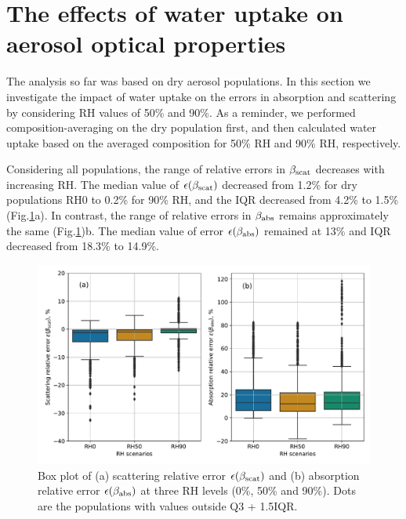 \documentclass[edeposit,fullpage]{uiucthesis2009}
\begin{document}
\section{The effects of water uptake on aerosol optical properties}
\label{sec:wet-case}
The analysis so far was based on dry aerosol populations. In this
section we investigate the impact of water uptake on the errors in
absorption and scattering by considering RH values of 50\% and 90\%.
As a reminder, we performed composition-averaging on the dry
population first, and then calculated water uptake based on the
averaged composition for 50\% RH and 90\% RH, respectively.

Considering all populations, the range of relative errors in
$\beta_{\rm scat}$ decreases with increasing RH. The median value of
$\epsilon(\beta_{\rm scat})$ decreased from 1.2\% for dry populations
RH0 to 0.2\% for 90\% RH, and the IQR decreased from 4.2\% to 1.5\%
(Fig.\ref{fig9:RH90-RH10-opt-scat}a).  In contrast, the range of
relative errors in $\beta_{\rm abs}$ remains approximately the same
(Fig.\ref{fig9:RH90-RH10-opt-scat})b. The median value of error
$\epsilon(\beta_{\rm abs})$ remained at 13\% and IQR decreased from
18.3\% to 14.9\%.
\begin{figure}
	\centering
	\includegraphics[scale=0.5]{chap4_figs/fig8.pdf}
	\caption{Box plot of (a) scattering relative error
          $\epsilon(\beta_{\rm scat})$ and (b) absorption relative
          error $\epsilon(\beta_{\rm abs})$ at three RH levels (0\%,
          50\% and 90\%). Dots are the populations with values outside
          Q3 + 1.5IQR. }
	\label{fig9:RH90-RH10-opt-scat}
\end{figure}
\end{document}
